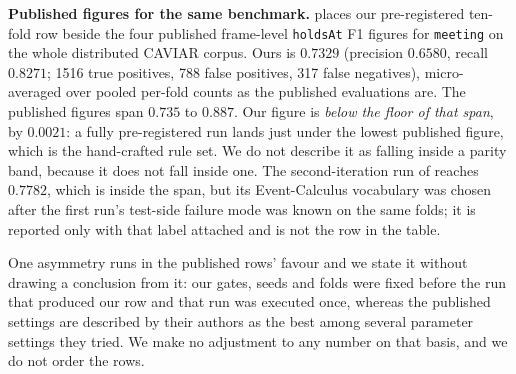 \textbf{Published figures for the same benchmark.}  places our pre-registered ten-fold row beside the four published frame-level \texttt{holdsAt} F1 figures for \texttt{meeting} on the whole distributed CAVIAR corpus. Ours is $0.7329$ (precision $0.6580$, recall $0.8271$; 1516 true positives, 788 false positives, 317 false negatives), micro-averaged over pooled per-fold counts as the published evaluations are. The published figures span $0.735$ to $0.887$. Our figure is \emph{below the floor of that span}, by $0.0021$: a fully pre-registered run lands just under the lowest published figure, which is the hand-crafted rule set. We do not describe it as falling inside a parity band, because it does not fall inside one. The second-iteration run of  reaches $0.7782$, which is inside the span, but its Event-Calculus vocabulary was chosen after the first run's test-side failure mode was known on the same folds; it is reported only with that label attached and is not the row in the table.

One asymmetry runs in the published rows' favour and we state it without drawing a conclusion from it: our gates, seeds and folds were fixed before the run that produced our row and that run was executed once, whereas the published settings are described by their authors as the best among several parameter settings they tried. We make no adjustment to any number on that basis, and we do not order the rows.


